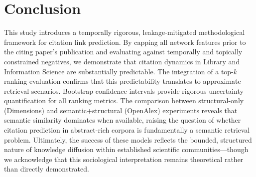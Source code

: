 \documentclass[11pt,a4paper]{article}
\begin{document}
\section{Conclusion}
\label{sec:conclusion}
This study introduces a temporally rigorous, leakage-mitigated methodological framework for citation link prediction. By capping all network features prior to the citing paper's publication and evaluating against temporally and topically constrained negatives, we demonstrate that citation dynamics in Library and Information Science are substantially predictable. The integration of a top-$k$ ranking evaluation confirms that this predictability translates to approximate retrieval scenarios. Bootstrap confidence intervals provide rigorous uncertainty quantification for all ranking metrics. The comparison between structural-only (Dimensions) and semantic+structural (OpenAlex) experiments reveals that semantic similarity dominates when available, raising the question of whether citation prediction in abstract-rich corpora is fundamentally a semantic retrieval problem. Ultimately, the success of these models reflects the bounded, structured nature of knowledge diffusion within established scientific communities---though we acknowledge that this sociological interpretation remains theoretical rather than directly demonstrated.



\end{document}
